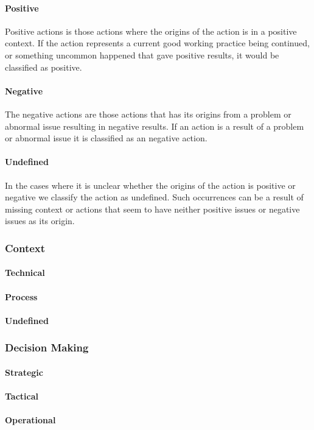 \paragraph{Positive} Positive actions is those actions where the origins of the action is in a positive context. If the action represents a current good working practice being continued, or something uncommon happened that gave positive results, it would be classified as positive.
\paragraph{Negative} The negative actions are those actions that has its origins from a problem or abnormal issue resulting in negative results. If an action is a result of a problem or abnormal issue it is classified as an negative action. 
\paragraph{Undefined} In the cases where it is unclear whether the origins of the action is positive or negative we classify the action as undefined. Such occurrences can be a result of missing context or actions that seem to have neither positive issues or negative issues as its origin. 
\subsubsection{Context}
\paragraph{Technical}
\paragraph{Process}
\paragraph{Undefined}
\subsubsection{Decision Making}
\paragraph{Strategic}
\paragraph{Tactical} 
\paragraph{Operational}
